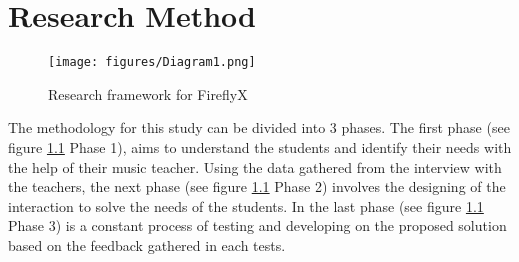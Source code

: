 %
%
%                 

\chapter{Research Method}



\begin{figure}[H]
    \centering
    \texttt{[image: figures/Diagram1.png]}
    \caption{Research framework for FireflyX}
    \label{fig:FireflyX}
\end{figure}

The methodology for this study can be divided into 3 phases. The first phase (see figure \ref{fig:FireflyX} Phase 1), aims to understand the students and identify their needs with the help of their music teacher. Using the data gathered from the interview with the teachers, the next phase (see figure \ref{fig:FireflyX} Phase 2) involves the designing of the interaction to solve the needs of the students. In the last phase (see figure \ref{fig:FireflyX} Phase 3) is a constant process of testing and developing on the proposed solution based on the feedback gathered in each tests.

